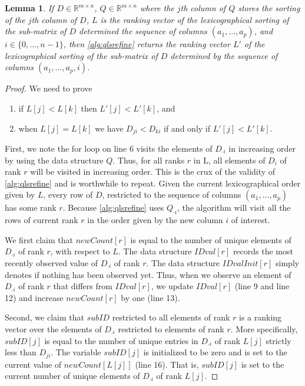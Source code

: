 \documentclass[a4paper,10pt,reqno]{amsart}
\newcommand\R{\mathbb R}
\newtheorem{lemma}{Lemma}
\theoremstyle{definition}
\begin{document}
\begin{lemma} 
\label{lem:qlsrefine}
If $D \in \R^{m \times n}$, $Q \in \R^{m \times n}$ where the $j$th column of
$Q$ stores the sorting of the $j$th column of
$D$, $L$ is the ranking vector of the lexicographical sorting of the
sub-matrix of $D$ determined the sequence of columns
$(a_1,\ldots,a_p)$, and $i \in \{0,\ldots,n-1\}$, then 
\autoref{alg:qlsrefine} returns the ranking vector $L'$ of the lexicographical
sorting of the sub-matrix of $D$ determined by the sequence of columns
$(a_1,\ldots,a_p,i)$.
\end{lemma}
\begin{proof}
We need to prove 
\begin{enumerate}
    \item if $L[j]< L[k]$ then $L'[j]< L'[k]$, and
    \item when $L[j]= L[k]$ we have $D_{ji} < D_{ki}$ if and only if $L'[j] < L'[k]$.
\end{enumerate}
First, we note the for
loop on line 6 visits the elements of $D_{\cdot i}$ in increasing order by using the
data structure $Q$. Thus, for all ranks $r$ in L, all elements of $D_i$ of rank
$r$ will be visited in increasing order. This is the crux of the validity of
\autoref{alg:qlsrefine} and is worthwhile to repeat. Given the current
lexicographical order given by $L$, every row of $D$, restricted to the
sequence of columns $(a_1,\ldots,a_p)$ has some rank $r$. Because \autoref{alg:qlsrefine}
uses $Q_{\cdot i}$, the algorithm will visit all the rows of current rank $r$ 
in the order given by the new column $i$ of interest.

We first claim that $newCount[r]$ is equal to the number of unique elements
of $D_{\cdot i}$ of rank $r$, with respect to $L$. The data structure $IDval[r]$ records
the most recently observed value of $D_{\cdot i}$ of rank $r$. The data structure
$IDvalInit[r]$ simply denotes if nothing has been observed yet. Thus, when
we observe an element of $D_{\cdot i}$ of rank $r$ that differs from $IDval[r]$,
we update $IDval[r]$ (line 9 and line 12) and increase $newCount[r]$ by
one (line 13).

Second, we claim that $subID$ restricted to all elements of rank $r$
is a ranking vector over the elements of $D_{\cdot i}$ restricted to elements of rank $r$.
More specifically, $subID[j]$ is equal to the number of unique entries in $D_{\cdot i}$
of rank $L[j]$ strictly less than $D_{j i}$. The variable $subID[j]$ is initialized 
to be zero and is set to the current value of $newCount[L[j]]$ (line 16). That is,
$subID[j]$ is set to the current number of unique elements of $D_{\cdot i}$ of
rank $L[j]$.


\end{proof}
\end{document}

